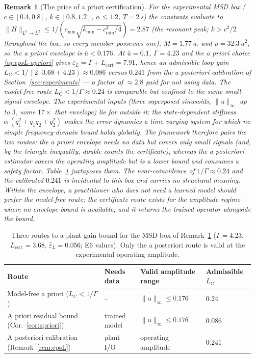 \documentclass[11pt]{article}
\newtheorem{remark}{Remark}
\newcommand{\Ltwo}{L^2}
\newcommand{\Lhat}{L_{\mathrm{cert}}}
\newcommand{\epsL}{\varepsilon_L}
\newcommand{\LC}{L_{\mathrm{C}}}
\begin{document}
\begin{remark}[The price of a priori certification]\label{rem:price}
For the experimental MSD box ($c\in[0.4,0.8]$, $k\in[0.8,1.2]$,
$\alpha\le1.2$, $T=2$\,s) the constants evaluate to
$\|H\|_{\Ltwo\to\Ltwo}\le 1/(c_{\min}\sqrt{k_{\min}-c_{\min}^2/4})=2.87$
(the resonant peak; $k>c^2/2$ throughout the box, so every member possesses
one), $\bar M=1.77\,\bar u$, and $\rho=32.3\,\bar u^2$, so the a priori
envelope is $\bar u<0.176$. At $\bar u=0.1$, $\Gamma=4.23$ and the a priori
choice \eqref{eq:epsL-apriori} gives $\epsL=\Gamma+\Lhat=7.91$, hence an
admissible loop gain $\LC<1/(2\cdot3.68+4.23)\approx0.086$ versus $0.241$
from the a posteriori calibration of Section~\ref{sec:experiments} --- a
factor of $\approx2.8$ paid for not using data. The model-free route
$\LC<1/\Gamma\approx0.24$ is comparable but confined to the same
small-signal envelope. The experimental inputs (three superposed sinusoids,
$\|u\|_\infty$ up to $3$, some $17\times$ that envelope) lie far outside
it: the state-dependent stiffness $\alpha\,(q_1^2+q_1q_2+q_2^2)$ makes the
error dynamics a \emph{time-varying} system for which no simple
frequency-domain bound holds globally. The framework therefore pairs the two
routes: the a priori envelope needs no data but covers only small signals
(and, by the triangle inequality, double-counts the certificate), whereas
the a posteriori estimator covers the operating amplitude but is a lower
bound and consumes a safety factor. Table~\ref{tab:routes} juxtaposes them.
The near-coincidence of $1/\Gamma\approx0.24$ and the calibrated $0.241$ is
incidental to this box and carries no structural meaning. Within the
envelope, a practitioner who does not need a learned model should prefer the
model-free route; the certificate route exists for the amplitude regime
where no envelope bound is available, and it returns the trained operator
alongside the bound.
\end{remark}

\begin{table}[t]
\centering\small
\caption{Three routes to a plant-gain bound for the MSD box of
Remark~\ref{rem:price} ($\Gamma=4.23$, $\Lhat=3.68$, $\hat\epsL=0.056$;
E6 values). Only the a posteriori route is valid at the experimental
operating amplitude.}
\label{tab:routes}
\begin{tabular}{p{4.6cm}p{2.2cm}p{3.2cm}p{2.2cm}}
\toprule
Route & Needs data & Valid amplitude range & Admissible $\LC$ \\
\midrule
Model-free a priori ($\LC<1/\Gamma$) & -- & $\|u\|_\infty\le0.176$ & $0.24$ \\
A priori residual bound (Cor.~\ref{cor:apriori}) & trained model & $\|u\|_\infty\le0.176$ & $0.086$ \\
A posteriori calibration (Remark~\ref{rem:epsL}) & plant I/O & operating amplitude & $0.241$ \\
\bottomrule
\end{tabular}
\end{table}
\end{document}
